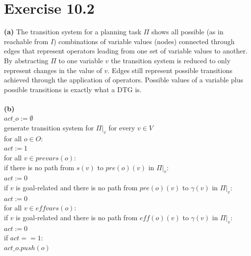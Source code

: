 \documentclass[11pt,a4paper]{article}
\begin{document}
\section*{Exercise 10.2}
\textbf{(a)} The transition system for a planning task $\Pi$ shows all possible (as in reachable from $I$) combinations of variable values (nodes) connected through edges that represent operators leading from one set of variable values to another. By abstracting $\Pi$ to one variable $v$ the transition system is reduced to only represent changes in the value of $v$. Edges still represent possible transitions achieved through the application of operators. Possible values of a variable plus possible transitions is exactly what a DTG is.\\
\\
\textbf{(b)}\\
$act\_o:=\emptyset$\\
generate transition system for $\Pi|_v$ for every $v\in V$\\
for all $o\in O$:\\
\hphantom{tab}$act:=1$\\
\hphantom{tab}for all $v\in prevars(o)$:\\
\hphantom{tabtab}if there is no path from $s(v)$ to $pre(o)(v)$ in $\Pi|_v$:\\
\hphantom{tabtabtab}$act:=0$\\
\hphantom{tabtab}if $v$ is goal-related and there is no path from $pre(o)(v)$ to $\gamma(v)$ in $\Pi|_v$:\\
\hphantom{tabtabtab}$act:=0$\\
\hphantom{tab}for all $v\in effvars(o)$:\\
\hphantom{tabtab}if $v$ is goal-related and there is no path from $eff(o)(v)$ to $\gamma(v)$ in $\Pi|_v$:\\
\hphantom{tabtabtab}$act:=0$\\
\hphantom{tab}if $act==1$:\\
\hphantom{tabtab}$act\_o.push(o)$\\

\label{lastpage}
\end{document}
